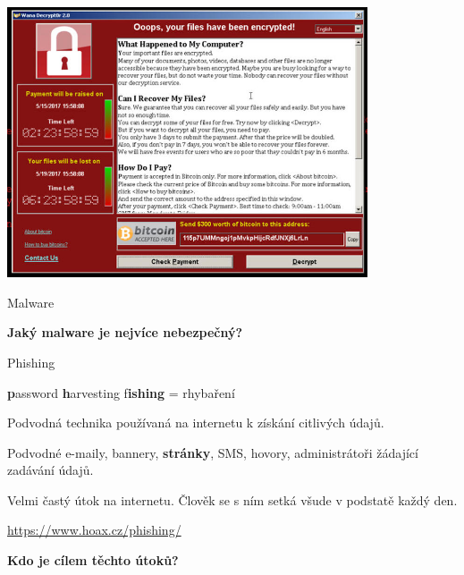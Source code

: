 \documentclass[aspectratio=169]{beamer}
\begin{document}
\begin{frame}
    \begin{center}
        \includegraphics[width=0.8\textwidth]{img/ransomware.jpg}
    \end{center}
\end{frame}

\begin{frame}{Malware}
    \begin{cardTiny}
        \begin{center}
            \textbf{Jaký malware je nejvíce nebezpečný?}
        \end{center}
    \end{cardTiny}
\end{frame}

\begin{frame}{Phishing}
    \begin{cardTiny}
        \begin{flushleft}
            \textbf{p}assword \textbf{h}arvesting f\textbf{ishing} = rhybaření

            \vspace{2ex}

            Podvodná technika používaná na internetu k získání citlivých údajů.

            Podvodné e-maily, bannery, \textbf{stránky}, SMS, hovory, administrátoři žádající zadávání údajů.

            \vspace{2ex}
            Velmi častý útok na internetu. Člověk se s ním setká všude v podstatě každý den.

            \vspace{2ex}
            \href{https://www.hoax.cz/phishing/}{https://www.hoax.cz/phishing/}
        \end{flushleft}
    \end{cardTiny}
    \begin{cardTiny}
        \begin{center}
            \textbf{Kdo je cílem těchto útoků?}
        \end{center}
    \end{cardTiny}
\end{frame}
\end{document}
